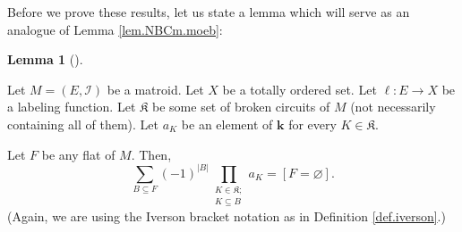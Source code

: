 \documentclass[numbers=enddot,12pt,final,onecolumn,notitlepage]{scrartcl}%
\theoremstyle{definition}
\newtheorem{lem}[theo]{Lemma}
\newenvironment{lemma}[1][]
{\begin{lem}[#1]\begin{leftbar}}
{\end{leftbar}\end{lem}}
\let\sumnonlimits\sum
\let\prodnonlimits\prod
\renewcommand{\sum}{\sumnonlimits\limits}
\renewcommand{\prod}{\prodnonlimits\limits}
\begin{document}
Before we prove these results, let us state a lemma which will serve as an
analogue of Lemma \ref{lem.NBCm.moeb}:

\begin{lemma}
\label{lem.matroid.NBCm.moeb}Let $M=\left(  E,\mathcal{I}\right)  $ be a
matroid. Let $X$ be a totally ordered set. Let $\ell:E\rightarrow X$ be a
labeling function. Let $\mathfrak{K}$ be some set of broken circuits of $M$
(not necessarily containing all of them). Let $a_{K}$ be an element of
$\mathbf{k}$ for every $K\in\mathfrak{K}$.

Let $F$ be any flat of $M$. Then,%
\begin{equation}
\sum_{B\subseteq F}\left(  -1\right)  ^{\left\vert B\right\vert }%
\prod_{\substack{K\in\mathfrak{K};\\K\subseteq B}}a_{K}=\left[  F=\varnothing
\right]  . \label{eq.lem.matroid.NBCm.moeb.1}%
\end{equation}
(Again, we are using the Iverson bracket notation as in Definition
\ref{def.iverson}.)
\end{lemma}
\end{document}
